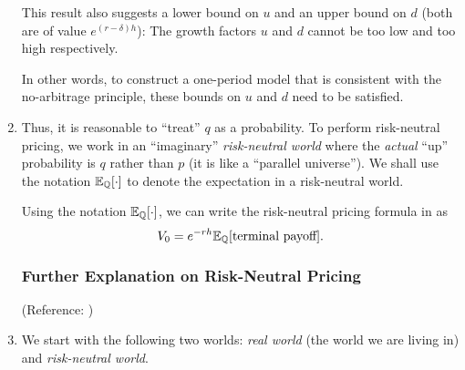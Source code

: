 \begin{enumerate}
\begin{note}
This result also suggests a lower bound on \(u\) and an upper bound on \(d\)
(both are of value \(e^{(r-\delta)h}\)): The growth factors \(u\) and \(d\)
cannot be too low and too high respectively.

In other words, to construct a one-period model that is consistent with the
no-arbitrage principle, these bounds on \(u\) and \(d\) need to be satisfied.
 \end{note}
\item \label{it:rn-pricing-fmla}
Thus, it is reasonable to ``treat'' \(q\) as a probability. To perform
risk-neutral pricing, we work in an ``imaginary'' \emph{risk-neutral world}
where the \emph{actual} ``up'' probability is \(q\) rather than \(p\) (it is
like a ``parallel universe''). We shall use the notation
\(\mathbb{E}_{\mathbb{Q}}\qty[\cdot]\) to denote the expectation in a risk-neutral world.


Using the notation \(\mathbb{E}_{\mathbb{Q}}\qty[\cdot]\), we can write the risk-neutral pricing
formula in  as
\[
V_0=e^{-rh}\mathbb{E}_{\mathbb{Q}}\qty[\text{terminal payoff}].
\]
\subsubsection*{Further Explanation on Risk-Neutral Pricing}
(Reference: \textcite[Section~4.1.2]{lo2018derivative})

\item We start with the following two worlds: \emph{real world} (the world we
are living in) and \emph{risk-neutral world}.
\begin{center}

\end{center}


\end{enumerate}
